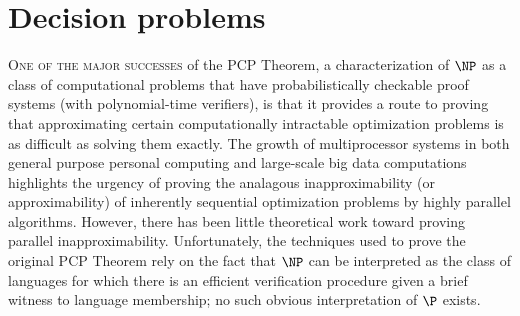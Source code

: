 \newcommand{\PCPcs}[5]{\PCP^{#1}_{#2, #3}\left[#4, #5\right]}
\newcommand{\loglog}{\log\log}
\newcommand{\ceil}[1]{\left\lceil{#1}\right\rceil}
\newcommand{\FSAT}{\textsc{FSat}}

\chapter{Decision problems}
\label{chp:decision}

%
%
%
\lettrine[loversize=0.1, lhang=0.05, findent=0.2em, nindent=0em]{O}{ne of the major successes} of the PCP Theorem, a characterization of $\NP$ as a class of computational problems that have probabilistically checkable proof systems (with polynomial-time verifiers), is that it provides a route to proving that approximating certain computationally intractable optimization problems is as difficult as solving them exactly.
%
%
%
The growth of multiprocessor systems in both general purpose personal computing and large-scale big data computations highlights the urgency of proving the analagous inapproximability (or approximability) of inherently sequential optimization problems by highly parallel algorithms.
However, there has been little theoretical work toward proving parallel inapproximability.
Unfortunately, the techniques used to prove the original PCP Theorem rely on the fact that $\NP$ can be interpreted as the class of languages for which there is an efficient verification procedure given a brief witness to language membership; no such obvious interpretation of $\P$ exists.

